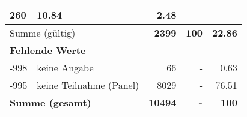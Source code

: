 \begin{longtable}{lXrrr}
       \num{260} &
       \num[round-mode=places,round-precision=2]{10,84} &
         \num[round-mode=places,round-precision=2]{2,48} \\
     \midrule
     \multicolumn{2}{l}{Summe (gültig)} &
       \textbf{\num{2399}} &
     \textbf{100} &
       \textbf{\num[round-mode=places,round-precision=2]{22,86}} \\
     \multicolumn{5}{l}{\textbf{Fehlende Werte}}\\
       -998 &
       keine Angabe &
         \num{66} &
        - &
         \num[round-mode=places,round-precision=2]{0,63} \\
       -995 &
       keine Teilnahme (Panel) &
         \num{8029} &
        - &
         \num[round-mode=places,round-precision=2]{76,51} \\
     \midrule
     \multicolumn{2}{l}{\textbf{Summe (gesamt)}} &
          \textbf{\num{10494}} &
        \textbf{-} &
        \textbf{100} \\
     \bottomrule
     \end{longtable}
     

